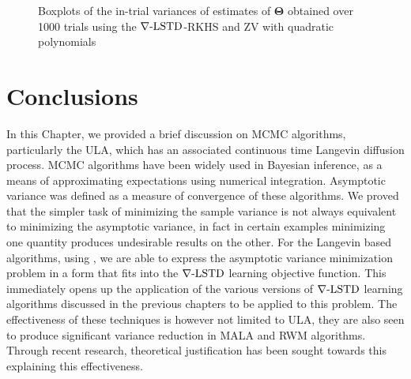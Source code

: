 \begin{figure}[htbp]
{		 
	} 
\caption{Boxplots of the in-trial variances of estimates of $\boldsymbol{\Theta}$ obtained over 1000 trials using the $\nabla\text{-LSTD}$-RKHS and ZV with quadratic polynomials}
\label{fig:mcmc_box_var_Theta}
\end{figure}

\section{Conclusions}
In this Chapter, we provided a brief discussion on MCMC algorithms, particularly the ULA, which has an associated continuous time Langevin diffusion process. MCMC algorithms have been widely used in Bayesian inference, as a means of approximating expectations using numerical integration. Asymptotic variance was defined as a measure of convergence of these algorithms. We proved that the simpler task of minimizing the sample variance is not always equivalent to minimizing the asymptotic variance, in fact in certain examples minimizing one quantity produces undesirable results on the other. For the Langevin based algorithms, using , we are able to express the asymptotic variance minimization problem in a form that fits into the $\nabla\text{-LSTD}$ learning objective function. This immediately opens up the application of the various versions of $\nabla\text{-LSTD}$ learning algorithms discussed in the previous chapters to be applied to this problem. The effectiveness of these techniques is however not limited to ULA, they are also seen to produce significant variance reduction in MALA and RWM algorithms. Through recent research, theoretical justification has been sought towards this explaining this effectiveness.  
